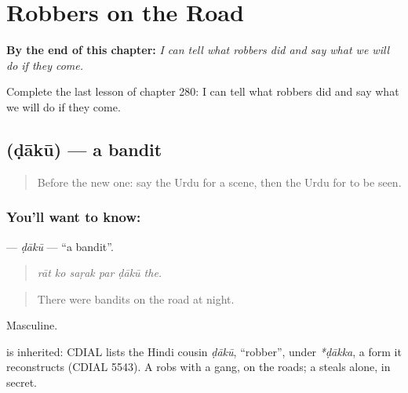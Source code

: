 
\chapter{Robbers on the Road}
\label{ch:ur-robbers-on-the-road}

\begin{chapteropening}
\textbf{By the end of this chapter:} \emph{I can tell what robbers did and say what we will do if they come.}

Complete the last lesson of chapter 280: I can tell what robbers did and say what we will do if they come.
\end{chapteropening}

\section[\texorpdfstring{\ur{ڈاکو} (ḍākū)}{ڈاکو (ḍākū)}]{ (ḍākū) — a bandit}

\label{lesson:UR-C280-daku}



\begin{quote}
Before the new one: say the Urdu for a scene, then the Urdu for to be seen.
\end{quote}

\subsection*{You'll want to know: }
\textbf{} — \emph{ḍākū} — \textquotedblleft{}a bandit\textquotedblright{}.

\begin{quote}
     
\end{quote}

\begin{quote}
\emph{rāt ko saṛak par ḍākū the.}
\end{quote}

\begin{quote}
There were bandits on the road at night.
\end{quote}

Masculine.

\begin{cousinweb}
is inherited: CDIAL lists the Hindi cousin \emph{ḍākū}, \textquotedblleft{}robber\textquotedblright{}, under \emph{*ḍākka}, a form it reconstructs (CDIAL 5543). A \textbf{} robs with a gang, on the roads; a \textbf{} steals alone, in secret.
\end{cousinweb}

